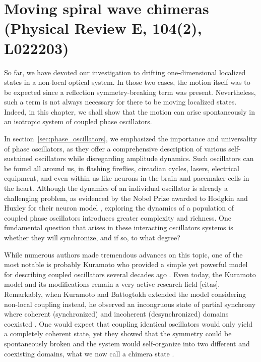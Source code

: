 \chapter{Moving spiral wave chimeras (Physical Review E, 104(2), L022203)}

So far, we have devoted our investigation to drifting one-dimensional localized states in a non-local optical system. 
In those two cases, the motion itself was to be expected since a reflection
symmetry-breaking term was present. Nevertheless, such a term is not always
necessary for there to be moving localized states. Indeed, in this chapter, 
we shall show that the motion can arise spontaneously
in an isotropic system of coupled phase oscillators.

In section~\ref{sec:phase_oscillators}, we emphasized the importance
and universality of phase oscillators, as they offer a comprehensive
description of various self-sustained oscillators while disregarding amplitude 
dynamics. Such oscillators can be found all around us,
in flashing fireflies, circadian cycles, lasers, electrical equipment, and even within us
like neurons in the brain and pacemaker cells in the heart. Although the dynamics
of an individual oscillator is already a challenging problem, as evidenced
by the Nobel Prize awarded to Hodgkin and Huxley for their neuron model
\cite{hodgkin1952quantitative},
exploring the dynamics of a population of coupled phase oscillators
introduces greater complexity and richness. One fundamental question that
arises in these interacting oscillators systems is whether they will synchronize, 
and if so, to what degree?

While numerous authors made tremendous advances on this topic, one of the
most notable is probably Kuramoto who provided a simple yet powerful model 
for describing coupled oscillators several decades ago \cite{kuramoto1975model}. Even today, the Kuramoto
model and its modifications remain a very active research field [citas].
Remarkably, when Kuramoto and Battogtokh extended the model considering non-local coupling instead, he observed an incongruous state
of partial synchrony where coherent (synchronized) and incoherent (desynchronized) domains coexisted \cite{kuramoto2002coexistence}.
One would expect that coupling identical oscillators would only yield a completely coherent
state, yet they showed that the symmetry could be spontaneously broken and the system
would self-organize into two different and coexisting domains, what we now call a chimera state \cite{abrams2004chimera}.

